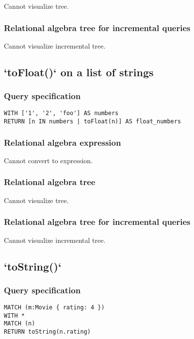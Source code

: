 Cannot visualize tree.

\subsubsection*{Relational algebra tree for incremental queries}

Cannot visualize incremental tree.

\subsection{`toFloat()` on a list of strings}

\subsubsection*{Query specification}

\begin{lstlisting}
WITH ['1', '2', 'foo'] AS numbers
RETURN [n IN numbers | toFloat(n)] AS float_numbers
\end{lstlisting}

\subsubsection*{Relational algebra expression}

Cannot convert to expression.

\subsubsection*{Relational algebra tree}

Cannot visualize tree.

\subsubsection*{Relational algebra tree for incremental queries}

Cannot visualize incremental tree.

\subsection{`toString()`}

\subsubsection*{Query specification}

\begin{lstlisting}
MATCH (m:Movie { rating: 4 })
WITH *
MATCH (n)
RETURN toString(n.rating)
\end{lstlisting}

